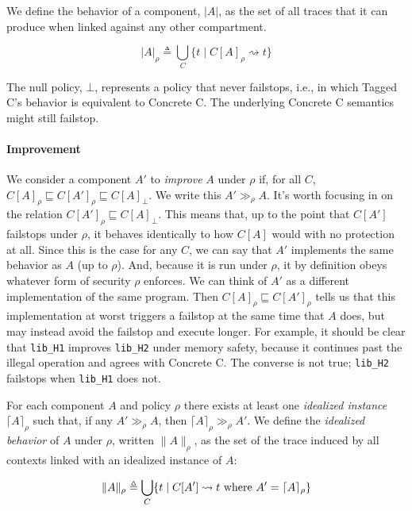\documentclass{article}
\begin{document}
We define the behavior of a component, \(|A|\), as the set of all traces
that it can produce when linked against any other compartment.

\[|A|_{\rho} \triangleq \bigcup_{C} \{ t \mid C[A]_{\rho} \rightsquigarrow t \}\]

The null policy, \(\bot\), represents a policy that never failstops,
i.e., in which Tagged C's behavior is equivalent to Concrete C.
The underlying Concrete C semantics might still failstop.

%

\paragraph{Improvement}

We consider a component \(A'\) to {\em improve} \(A\) under \(\rho\) if, for all \(C\),
\(C[A]_\rho \sqsubseteq C[A']_\rho \sqsubseteq C[A]_\bot\).
We write this \(A' \gg_\rho A\).
It's worth focusing in on the relation \(C[A']_\rho \sqsubseteq C[A]_\bot\). This means that,
up to the point that \(C[A']\) failstops under \(\rho\), it behaves identically to
how \(C[A]\) would with no protection at all. Since this is the case for any \(C\), we can say
that \(A'\) implements the same behavior as \(A\) (up to \(\rho\)). And, because it is run
under \(\rho\), it by definition obeys whatever form of security \(\rho\) enforces.
We can think of \(A'\) as a different implementation of the same program.
Then \(C[A]_\rho \sqsubseteq C[A']_\rho\) tells us that this implementation at worst
triggers a failstop at the same time that \(A\) does, but may instead avoid the failstop
and execute longer. For example, it should be clear that {\tt lib\_H1} improves
{\tt lib\_H2} under memory safety, because it continues past the illegal operation and
agrees with Concrete C. The converse is not true; {\tt lib\_H2} failstops when {\tt lib\_H1}
does not.

For each component \(A\) and policy \(\rho\) there exists at least one {\em idealized instance}
\(\lceil A \rceil_\rho\) such that, if any \(A' \gg_\rho A\), then
\(\lceil A \rceil_\rho \gg_\rho A'\). We define the {\em idealized behavior} of \(A\) under
\(\rho\), written \(\| A \|_\rho\), as the set of the trace induced by all contexts linked with
an idealized instance of \(A\):

\[\| A \|_\rho \triangleq \bigcup_{C} \{ t \mid C[A'] \rightsquigarrow t \textnormal{ where }
A' = \lceil A \rceil_\rho\} \]
\end{document}

